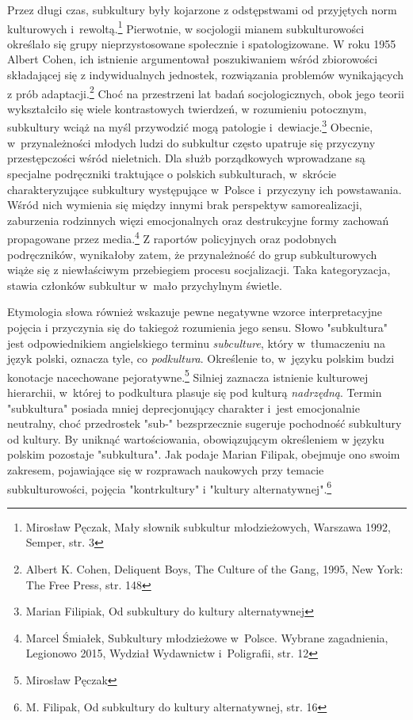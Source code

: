 \documentclass[12pt, a4paper, titlepage]{report}
\begin{document}
Przez długi czas, subkultury były kojarzone z odstępstwami od przyjętych norm kulturowych i~rewoltą.\footnote{Mirosław Pęczak, Mały słownik subkultur młodzieżowych, Warszawa 1992, Semper, str. 3} Pierwotnie, w socjologii mianem subkulturowości określało się grupy nieprzystosowane społecznie i spatologizowane. W roku 1955 Albert Cohen, ich istnienie argumentował poszukiwaniem wśród zbiorowości składającej się z indywidualnych jednostek, rozwiązania problemów wynikających z prób adaptacji.\footnote{Albert K. Cohen, Deliquent Boys, The Culture of the Gang, 1995, New York: The Free Press, str. 148} Choć na przestrzeni lat badań socjologicznych, obok jego teorii wykształciło się wiele kontrastowych twierdzeń, w rozumieniu potocznym, subkultury wciąż na myśl przywodzić mogą patologie i~dewiacje.\footnote{Marian Filipiak, Od subkultury do kultury alternatywnej} Obecnie, w~przynależności młodych ludzi do subkultur często upatruje się przyczyny przestępczości wśród nieletnich. Dla służb porządkowych wprowadzane są specjalne podręczniki traktujące o polskich subkulturach, w~skrócie charakteryzujące subkultury występujące w~Polsce i~przyczyny ich powstawania. Wśród nich wymienia się między innymi brak perspektyw samorealizacji, zaburzenia rodzinnych więzi emocjonalnych oraz destrukcyjne formy zachowań propagowane przez media.\footnote{Marcel Śmiałek, Subkultury młodzieżowe w~Polsce. Wybrane zagadnienia, Legionowo 2015, Wydział Wydawnictw i~Poligrafii, str. 12} Z raportów policyjnych oraz podobnych podręczników, wynikałoby zatem, że przynależność do grup subkulturowych wiąże się z niewłaściwym przebiegiem procesu socjalizacji. Taka kategoryzacja, stawia członków subkultur w~mało przychylnym świetle. 

Etymologia słowa również wskazuje pewne negatywne wzorce interpretacyjne pojęcia i przyczynia się do takiegoż rozumienia jego sensu. Słowo "subkultura" jest odpowiednikiem angielskiego terminu \textit{subculture}, który w~tłumaczeniu na język polski, oznacza tyle, co \textit{podkultura}. Określenie to, w~języku polskim budzi konotacje nacechowane pejoratywne.\footnote{Mirosław Pęczak} Silniej zaznacza istnienie kulturowej hierarchii, w~której to podkultura plasuje się pod kulturą \textit{nadrzędną}. Termin "subkultura" posiada mniej deprecjonujący charakter i~jest emocjonalnie neutralny, choć przedrostek "sub-" bezsprzecznie sugeruje pochodność subkultury od kultury. By uniknąć wartościowania, obowiązującym określeniem w języku polskim pozostaje "subkultura". Jak podaje Marian Filipak, obejmuje ono swoim zakresem, pojawiające się w rozprawach naukowych przy temacie subkulturowości, pojęcia "kontrkultury" i "kultury alternatywnej".\footnote{M. Filipak, Od subkultury do kultury alternatywnej, str. 16}
\end{document}
